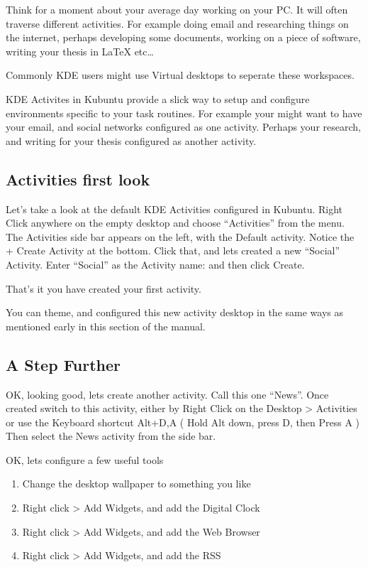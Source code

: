 \documentclass[letterpaper,10pt,english]{sphinxmanual}
\begin{document}
Think for a moment about your average day working on your PC. It will often traverse different activities. For example doing email and researching things on the internet, perhaps developing some documents, working on a piece of software, writing your thesis in LaTeX etc…

Commonly KDE users might use Virtual desktops to seperate these workspaces.

KDE Activites in Kubuntu provide a slick way to setup and configure environments specific to your task routines. For example your might want to have your email, and social networks configured as one activity. Perhaps your research, and writing for your thesis configured as another activity.


\subsection{Activities first look}
\label{\detokenize{docs/basic:activities-first-look}}

Let’s take a look at the default KDE Activities configured in Kubuntu. Right Click anywhere on the empty desktop and choose “Activities” from the menu. The Activities side bar appears on the left, with the Default activity. Notice the + Create Activity at the bottom. Click that, and lets created a new “Social” Activity.
Enter “Social” as the Activity name: and then click Create.

That’s it you have created your first activity.

You can theme, and configured this new activity desktop in the same ways as mentioned early in this section of the manual.


\subsection{A Step Further}
\label{\detokenize{docs/basic:a-step-further}}
OK, looking good, lets create another activity. Call this one “News”. Once created switch to this activity, either by Right Click on the Desktop \textgreater{} Activities or use the Keyboard shortcut Alt+D,A ( Hold Alt down, press D, then Press A )
Then select the News activity from the side bar.

OK, lets configure a few useful tools
\begin{enumerate}
\item {} 
Change the desktop wallpaper to something you like

\item {} 
Right click \textgreater{} Add Widgets, and add the Digital Clock

\item {} 
Right click \textgreater{} Add Widgets, and add the Web Browser

\item {} 
Right click \textgreater{} Add Widgets, and add the RSS

\end{enumerate}
\end{document}
